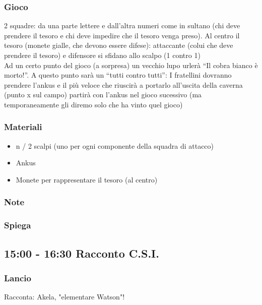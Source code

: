 \documentclass[../main.tex]{subfiles}
\begin{document}
        \subsubsection{Gioco}
        2 squadre: da una parte lettere e dall'altra numeri come in sultano (chi deve prendere il tesoro e chi deve impedire che il tesoro venga preso). Al centro il tesoro (monete gialle, che devono essere difese): attaccante (colui che deve prendere il tesoro) e difensore si sfidano allo scalpo (1 contro 1)\\
       Ad un certo punto del gioco (a sorpresa) un vecchio lupo urlerà “Il cobra bianco è morto!”. A questo punto sarà un “tutti contro tutti”: I fratellini dovranno prendere l'ankus e il più veloce che riuscirà a portarlo all'uscita della caverna (punto x sul campo) partirà con l'ankus nel gioco sucessivo (ma temporaneamente gli diremo solo che ha vinto quel gioco)

        \subsubsection{Materiali}
            \begin{itemize}
                \item n / 2 scalpi (uno per ogni componente della squadra di attacco)
                \item Ankus
                \item Monete per rappresentare il tesoro (al centro)
            \end{itemize}
        \subsubsection{Note}
        \subsubsection{Spiega}

    \subsection{15:00 - 16:30 Racconto C.S.I.}
       \subsubsection{Lancio}
       Racconta: Akela, "elementare Watson"!
\end{document}
